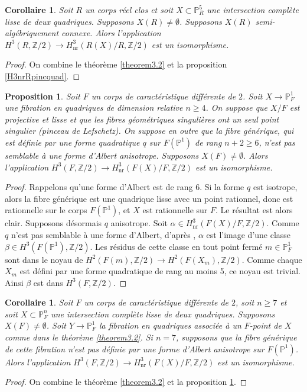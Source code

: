 \documentclass[11pt]{article}
\newtheorem{prop}[thm]{Proposition}
\newtheorem{cor}[thm]{Corollaire}
\theoremstyle{definition}
\newcommand{\Z}{\mathbb Z}
\renewcommand{\P}{\mathbb P}
\newcommand{\on}[1]{\operatorname{#1}}
\begin{document}
\begin{cor}\label{H3Rnrdeuxquad}
Soit $R$ un corps réel clos et soit $X \subset \P^5_{R}$ une intersection complète lisse de deux quadriques. Supposons $X(R) \neq \emptyset$. Supposons $X(R)$ semi-algébriquement connexe.
Alors l'application $ H^3(R, \Z/2) \to H^3_{\on{nr}}(R(X)/R, \Z/2)$
est un isomorphisme.
\end{cor}

\begin{proof}
On combine le théorème \ref{theorem3.2} et la proposition \ref{H3nrRpincquad}.
\end{proof}

\begin{prop}\label{fibP1Rrelplus4}
Soit $F$ un corps de caractéristique différente de $2$.
Soit $X\to \P^1_{F}$ une fibration en quadriques de dimension relative $n\geq 4$.
On suppose que $X/F$ est projective et lisse
et que les fibres géométriques singulières ont un seul point singulier
(pinceau de Lefschetz).
On suppose en outre que la fibre générique, qui est définie par
une forme quadratique $q$ sur $F(\P^1)$ de rang $n+2\geq 6 $,
n'est pas semblable à une forme d'Albert anisotrope.
Supposons $X(F)\neq \emptyset$.
Alors l'application $H^3(F,\Z/2) \to H^3_{\on{nr}}(F(X)/F, \Z/2)$ est
un isomorphisme.
\end{prop}

\begin{proof}
Rappelons qu'une forme d'Albert est de rang $6$. Si la forme $q$ est isotrope, alors la fibre générique est une quadrique lisse avec un point rationnel, donc est rationnelle sur le corps $F(\P^1)$,
et $X$ est rationnelle sur $F$. Le résultat est alors clair. Supposons désormais $q$ anisotrope.
Soit $\alpha \in H^3_{\on{nr}}(F(X)/F, \Z/2)$. Comme $q$
n'est pas semblable à une forme d'Albert, d'après
\cite[Th.\,5]{kahn1998unramified},
$\alpha$ est l'image d'une classe $\beta \in H^3(F(\P^1),\Z/2)$.
Les résidus de cette classe en tout point fermé $m \in \P^1_F$
sont dans le noyau de $H^2(F(m), \Z/2) \to H^2(F(X_{m}), \Z/2)$.
Comme chaque $X_{m}$ est défini par une forme quadratique de rang au moins 5,
ce noyau est trivial. Ainsi $\beta$ est dans $H^3(F,\Z/2)$.
\end{proof}

\begin{cor}\label{2quadsurFngeq7}
Soit $F$ un corps de caractéristique différente de $2$, soit \hbox{$n\!\geq\! 7$} et soit $X \!\subset\! \P^n_F$ une intersection complète lisse de deux quadriques. Supposons \hbox{$X(F) \!\neq\! \emptyset$}.
Soit $Y \to \P^1_F$ la fibration en quadriques associée à un $F$-point de $X$ comme dans le théorème \ref{theorem3.2}.
Si $n=7$, supposons que la fibre générique de cette fibration n'est pas définie par une forme d'Albert anisotrope sur $F(\P^1)$. Alors l'application $H^3(F,\Z/2) \to H^3_{\on{nr}}(F(X)/F, \Z/2)$ est un isomorphisme.
\end{cor}
\begin{proof}
On combine le théorème \ref{theorem3.2} et la proposition \ref{fibP1Rrelplus4}.
\end{proof}
\end{document}
